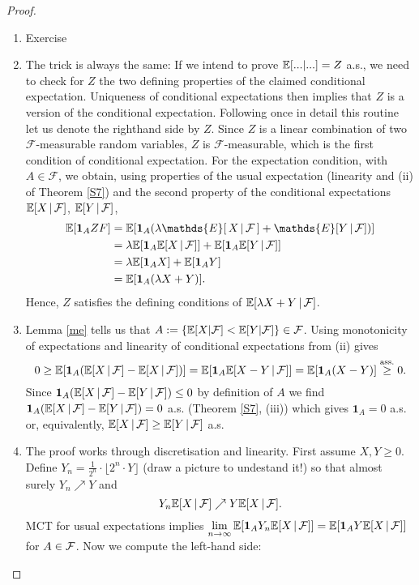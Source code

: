 \begin{proof}[Proof]
	\begin{enumerate}[label=(\roman*)]
		\item Exercise
		\item The trick is always the same: If we intend to prove $\mathbb{E}[...|...]=Z$ a.s., we need to check for $Z$ the two defining properties of the claimed conditional expectation. Uniqueness of conditional expectations then implies that $Z$ is a version of the conditional expectation. Following once in detail this routine let us denote the righthand side by $Z$. Since $Z$ is a linear combination of two $\mathcal F$-measurable random variables, $Z$ is $\mathcal F$-measurable, which is the first condition of conditional expectation. For the expectation condition, with $A\in\mathcal F$, we obtain, using properties of the usual expectation (linearity and (ii) of Theorem \ref{S7}) and the second property of the conditional expectations $\mathbb{E}[X\,|\,\mathcal F]$, $\mathbb{E}[Y\,|\, \mathcal F]$,
			\begin{align*}
				\E[\mathbf 1_A Z F]&=\mathbb E[\mathbf{1}_A(\lambda\mathds{E}[\, X \, | \, \mathcal{F}\, ]+\mathds{E}[Y \, | \, \mathcal{F}])]\\
				&=\lambda\mathbb E[\mathbf{1}_A\mathbb E[X\,|\,\cF]]+\mathbb E[\mathbf{1}_A\mathbb E[Y\,|\,\cF]]\\
					&=\lambda\mathbb E[\mathbf{1}_A X]+\mathbb E[\mathbf{1}_A Y]\\
					&=\mathbb E[\mathbf 1_A (\lambda X+Y)].
			\end{align*}
			Hence, $Z$ satisfies the defining conditions of $\mathbb{E}[\lambda X+Y\, |\, \mathcal F]$.
		\item \label{ii} Lemma \ref{me} tells us that $A:=\lbrace\mathbb E[X|\mathcal{F}]<\mathbb E[Y|\mathcal{F}]\rbrace\in \mathcal{F}$. Using monotonicity of expectations and linearity of conditional expectations from (ii) gives
			$$0 \geq \mathbb E[\mathbf 1_A (\mathbb E[X\,|\,\mathcal{F}]-\mathbb E[X\,|\,\mathcal{F}])] =\mathbb E[\mathbf 1_A \mathbb E[X-Y\,|\,\mathcal{F}]] = \mathbb E[\mathbf 1_A (X-Y)]\overset{\text{ass.}}{\geq} 0.$$ Since $\mathbf 1_A (\mathbb E[X\,|\,\mathcal{F}]-\mathbb E[Y\,|\,\mathcal{F}]) \leq 0$ by definition of $A$ we find $\mathbf 1_A (\mathbb E[X\,|\,\mathcal{F}]-\mathbb E[Y\,|\,\mathcal{F}]) = 0$ a.s. (Theorem \ref{S7}, (iii)) which gives $\mathbf 1_A = 0$ a.s. or, equivalently, $\mathbb E[X\,|\,\mathcal{F}]\geq\mathbb E[Y\,|\,\mathcal{F}]$ a.s.
		\item The proof works through discretisation and linearity. First assume $X,Y\geq 0$. Define $Y_n = \frac{1}{2^n} \cdot \lfloor 2^n \cdot Y \rfloor$ (draw a picture to undestand it!) so that almost surely $Y_n \nearrow Y$ and $$Y_n \mathbb E[X\,|\,\mathcal{F}] \nearrow Y \mathbb E[X\,|\,\mathcal{F}].$$ MCT for usual expectations implies $\lim \limits_{n \to \infty}\mathbb E[\mathbf 1_A Y_n \mathbb E[X\,|\,\mathcal{F}]]=\mathbb E[\mathbf 1_A Y \mathbb E[X\,|\,\mathcal{F}]]$ for $A\in\mathcal{F}$. Now we compute the left-hand side:

\end{enumerate}
\end{proof}
